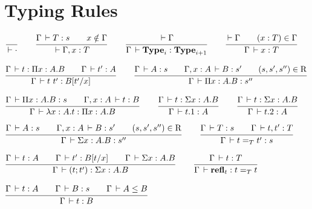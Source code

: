 \documentclass[a4paper,english]{lipics-utf8x}
\begin{document}
  \section{Typing Rules}

  \begin{center}
  \(
    \ru{}{\der \cdot}
    \qquad
    \ru{\Gamma \der T : s \qquad
        x \notin \Gamma
      }{\der \Gamma, x : T}
    \qquad
    \ru{\der \Gamma
      }{\Gamma \der \Type_i : \Type_{i+1}}
    \qquad
    \ru{\der \Gamma \qquad
        (x : T) \in \Gamma
      }{\Gamma \der x : T}
  \)
  \end{center}

  \begin{center}
  \(
    \ru{\Gamma \der t : \Pi x:A.B \qquad
        \Gamma \der t' : A
      }{\Gamma \der t\ t' : B[t'/x]}
    \qquad
    \ru{\Gamma \der A : s \qquad
        \Gamma, x:A \der B : s' \qquad
        (s,s',s'') \in \R
      }{\Gamma \der \Pi x:A.B : s''}
  \)
  \end{center}

  \begin{center}
  \(
    \ru{\Gamma \der \Pi x:A.B : s \qquad
        \Gamma, x:A \der t : B
      }{\Gamma \der \lambda x:A.t : \Pi x:A.B}
    \qquad
    \ru{\Gamma \der t : \Sigma x:A.B
      }{\Gamma \der t.1 : A}
    \qquad
    \ru{\Gamma \der t : \Sigma x:A.B
      }{\Gamma \der t.2 : A}
  \)
  \end{center}

  \begin{center}
  \(
    \ru{\Gamma \der A : s \qquad
        \Gamma, x:A \der B : s' \qquad
        (s,s',s'') \in \R
      }{\Gamma \der \Sigma x:A.B : s''}
    \qquad
    \ru{\Gamma \der T : s \qquad
        \Gamma \der t,t' : T
      }{\Gamma \der t =_T t' : s}
  \)
  \end{center}

  \begin{center}
  \(
    \ru{\Gamma \der t : A \qquad
        \Gamma \der t' : B[t/x] \qquad
        \Gamma \der \Sigma x:A.B
      }{\Gamma \der (t;t') : \Sigma x:A.B}
    \qquad
    \ru{\Gamma \der t : T
      }{\Gamma \der \refl_t : t =_T t}
  \)
  \end{center}

  \begin{center}
  \(
    \ru{\Gamma \der t : A \qquad
        \Gamma \der B : s \qquad
        \Gamma \der A \le B
      }{\Gamma \der t : B}
  \)
  \end{center}
\end{document}

